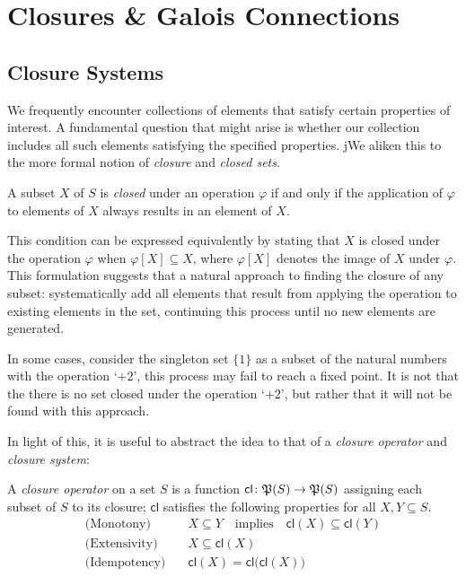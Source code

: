 \section{Closures \& Galois Connections}
\label{section:closure-systems}

\subsection{Closure Systems}
We frequently encounter collections of elements that satisfy certain properties of interest. A fundamental question that
might arise is whether our collection includes all such elements satisfying the specified properties. jWe aliken this to
the more formal notion of \textit{closure} and \textit{closed sets}.

\begin{definition}
	 \label{definition:closed-set}

	A subset $X$ of $S$ is \textit{closed} under an operation $\varphi$ if and only if the application of $\varphi$ to elements
	of $X$ always results in an element of $X$.
\end{definition}

This condition can be expressed equivalently by stating that $X$ is closed under the operation $\varphi$ when $\varphi [X
] \subseteq X$, where $\varphi[X]$ denotes the image of $X$ under $\varphi$. This formulation suggests that a natural approach
to finding the closure of any subset: systematically add all elements that result from applying the operation to
existing elements in the set, continuing this process until no new elements are generated.

In some cases, consider the singleton set $\{1\}$ as a subset of the natural numbers with the operation `$+ 2$', this process
may fail to reach a fixed point. It is not that the there is no set closed under the operation `$+2$', but rather that it
will not be found with this approach.

In light of this, it is useful to abstract the idea to that of a \textit{closure operator} and \textit{closure system}:

\begin{definition}
	 \label{definition:closure-operator}

	A \emph{closure operator} on a set $S$ is a function $\mathsf{cl}\colon \mathfrak{P}({S})\to \mathfrak{P}({S})$ assigning each subset of
	$S$ to its closure; $\mathsf{cl}$ satisfies the following properties for all $X,Y \subseteq S$.
	\begin{align}
		\text{(Monotony)}\quad    & X \subseteq Y\quad \text{implies}\quad\mathsf{cl}(X) \subseteq \mathsf{cl}(Y) \\
		\text{(Extensivity)}\quad & X \subseteq \mathsf{cl}(X)                                                    \\
		\text{(Idempotency)}\quad & \mathsf{cl}(X) = \mathsf{cl}\big(\mathsf{cl}(X)\big)
	\end{align}
\end{definition}

